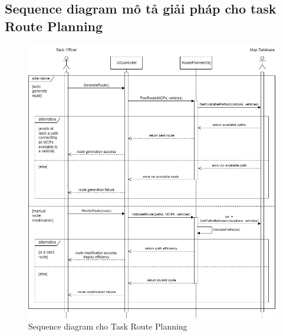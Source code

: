     \subsection{Sequence diagram mô tả giải pháp cho task Route Planning}
        \begin{figure}[H]
            \centering
            \includegraphics[width=1\linewidth]{imgs/sequence diagram/Sequence Diagram 2.2.png}
            \caption{Sequence diagram cho Task Route Planning}
        \end{figure}
    
        \newpage
